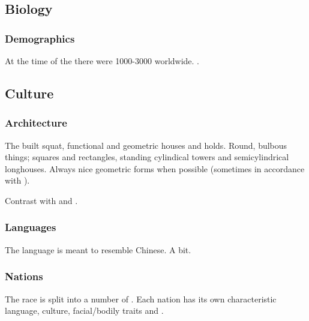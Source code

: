 \subsection{Biology}





\subsubsection{Demographics}
At the time of the \thirdbanewar there were 1000-3000 \quiljaaran worldwide. 
.










\subsection{Culture}





\subsubsection{Architecture}
The \quiljaaran{} built squat, functional and geometric houses and holds. 
Round, bulbous things; squares and rectangles, standing cylindical towers and semicylindrical longhouses. 
Always nice geometric forms when possible (sometimes in accordance with ). 

Contrast with  and . 





\subsubsection{Languages}
The \quiljaaran{} language is meant to resemble Chinese. 
A bit. 





\subsubsection{Nations}
The \quiljaaran{} race is split into a number of . 
Each nation has its own characteristic language, culture, facial/bodily traits and \colours. 

